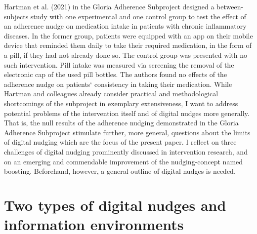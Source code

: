 \documentclass[reflection, authordate]{jote-new-article}
\begin{document}
Hartman et al. (2021) in the Gloria Adherence Subproject designed a between-subjects study with one experimental and one control group to test the effect of an adherence nudge on medication intake in patients with chronic inflammatory diseases. In the former group, patients were equipped with an app on their mobile device that reminded them daily to take their required medication, in the form of a pill, if they had not already done so. The control group was presented with no such intervention. Pill intake was measured via screening the removal of the electronic cap of the used pill bottles. The authors found no effects of the adherence nudge on patients‘ consistency in taking their medication. While Hartman and colleagues already consider practical and methodological shortcomings of the subproject in exemplary extensiveness, I want to address potential problems of the intervention itself and of digital nudges more generally. That is, the null results of the adherence nudging demonstrated in the Gloria Adherence Subproject stimulate further, more general, questions about the limits of digital nudging which are the focus of the present paper. I reflect on three challenges of digital nudging prominently discussed in intervention research, and on an emerging and commendable improvement of the nudging-concept named boosting. Beforehand, however, a general outline of digital nudges is needed.



\section{Two types of digital nudges and information environments}
\end{document}
